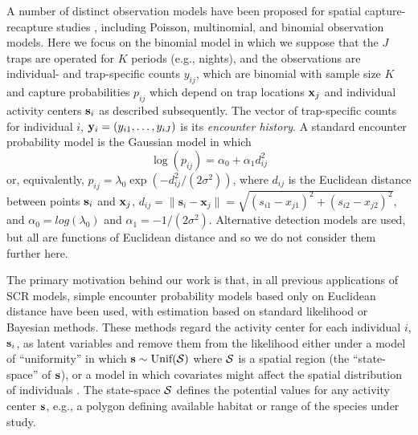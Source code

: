 \documentclass[12pt]{article}
\begin{document}
A number of distinct observation models have been proposed for spatial
capture-recapture studies \citep{borchers_efford:2008,
  royle_etal:2009ecol, efford_etal:2009ecol}, including Poisson,
multinomial, and binomial observation models.
Here we focus on the binomial model in which we suppose that the $J$
traps %
are operated for $K$ periods (e.g., nights), and the observations are
individual- and trap-specific counts $y_{ij}$, which are binomial with
sample size $K$ and capture probabilities $p_{ij}$ which depend on
trap locations ${\bf x}_{j}$ and individual activity centers ${\bf
  s}_{i}$ as described subsequently.  The vector of trap-specific
counts for individual $i$, ${\bf y}_{i} = (y_{i1},\ldots,y_{iJ})$ is
its {\it encounter history}.  A standard encounter probability model
\citep{borchers_efford:2008} is the Gaussian model in which
\begin{equation}
\log(p_{ij})= \alpha_{0} + \alpha_{1} d_{ij}^{2}
\label{eq.encounter}
\end{equation}
or, equivalently,
$p_{ij} = \lambda_{0} \exp(-d_{ij}^{2} /(2\sigma^{2}) )$,
where %
$d_{ij}$ is the Euclidean
distance between points ${\bf s}_{i}$ and ${\bf x}_{j}$,
$d_{ij} = \|\textbf{s}_i - \textbf{x}_j\| = \sqrt{(s_{i1}-x_{j1})^2 +
  (s_{i2}-x_{j2})^2}$,
and
 $\alpha_{0} = log(\lambda_{0})$ and $\alpha_{1} = -1/(2\sigma^2)$.
Alternative detection models are used, but all are
functions of Euclidean distance and so we do not consider them
further here.

The primary motivation behind our work is that, in all previous
applications of SCR models, simple encounter probability models based
only on Euclidean distance have been used, with estimation based on
standard likelihood or Bayesian methods. These methods regard the
activity center for each individual $i$, ${\bf s}_{i}$, as latent
variables and remove them from the likelihood either under a model of
``uniformity'' in which ${\bf s} \sim \mbox{Unif}({\cal S})$ where
${\cal S}$ is a spatial region (the ``state-space'' of ${\bf s}$), or
a model in which covariates might affect the spatial distribution of
individuals \citep{borchers_efford:2008}. The state-space ${\cal S}$
defines the potential values for any activity center ${\bf s}$, e.g.,
a polygon defining available habitat or range of the species under
study.
\end{document}
